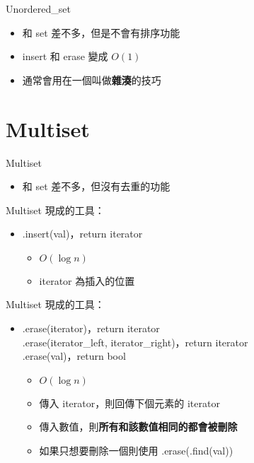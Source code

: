 \documentclass[mathserif]{beamer}
\begin{document}
\begin{frame}{Unordered\_set}
    \begin{itemize}
        \item 和 set 差不多，但是不會有排序功能
        \item insert 和 erase 變成 $O(1)$
        \item 通常會用在一個叫做\textbf{雜湊}的技巧
    \end{itemize}
\end{frame}

\section{Multiset}
\begin{frame}{Multiset}
    \begin{itemize}
        \item 和 set 差不多，但沒有去重的功能
    \end{itemize}
\end{frame}

\begin{frame}{Multiset}
    現成的工具：
    \begin{itemize}
        \item .insert({\color{red}val})，return iterator
        \begin{itemize}
            \item $O(\log{n})$
            \item iterator 為插入的位置
        \end{itemize}
    \end{itemize}
\end{frame}

\begin{frame}{Multiset}
    現成的工具：
    \begin{itemize}
        \item .erase({\color{red}iterator})，return iterator
        \\.erase({\color{red}iterator\_left}, {\color{red}iterator\_right})，return iterator
        \\.erase({\color{red}val})，return bool
        \begin{itemize}
            \item $O(\log{n})$
            \item 傳入 iterator，則回傳下個元素的 iterator
            \item 傳入數值，則\textbf{所有和該數值相同的都會被刪除}
            \item 如果只想要刪除一個則使用 .erase(.find({\color{red}val}))
        \end{itemize}
    \end{itemize}
\end{frame}
\end{document}
